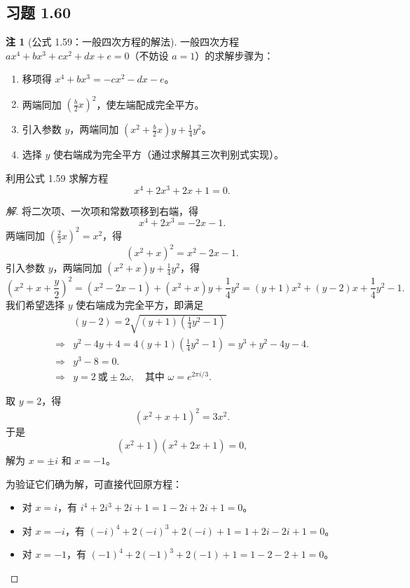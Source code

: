 \documentclass[11pt,a4paper]{article}
\theoremstyle{definition}
\newtheorem{remark}[theorem]{注}
\newenvironment{solution}{\begin{proof}[解]}{\end{proof}}
\begin{document}
\subsection{习题 1.60}

\begin{remark}[公式 1.59：一般四次方程的解法]
  一般四次方程 $ax^4 + bx^3 + cx^2 + dx + e = 0$（不妨设 $a=1$）的求解步骤为：
  \begin{enumerate}
    \item 移项得 $x^4 + bx^3 = -cx^2 - dx - e$。
    \item 两端同加 $(\frac{b}{2}x)^2$，使左端配成完全平方。
    \item 引入参数 $y$，两端同加 $(x^2 + \frac{b}{2}x)y + \frac{1}{4}y^2$。
    \item 选择 $y$ 使右端成为完全平方（通过求解其三次判别式实现）。
  \end{enumerate}
\end{remark}

利用公式 1.59 求解方程
\[
  x^4 + 2x^3 + 2x + 1 = 0.
\]

\begin{solution}
将二次项、一次项和常数项移到右端，得
\[
  x^4 + 2x^3 = -2x - 1.
\]
两端同加 $(\frac{2}{2}x)^2 = x^2$，得
\[
  (x^2 + x)^2 = x^2 - 2x - 1.
\]
引入参数 $y$，两端同加 $(x^2 + x)y + \frac{1}{4}y^2$，得
\[
  (x^2 + x + \frac{y}{2})^2 = (x^2 - 2x - 1) + (x^2 + x)y + \frac{1}{4}y^2
  = (y+1) x^2 + (y - 2)x + \frac{1}{4}y^2 - 1.
\]
我们希望选择 $y$ 使右端成为完全平方，即满足
\[
  \begin{aligned}
    &(y-2) = 2 \sqrt{(y+1)(\frac{1}{4}y^2-1)} \\
    \Rightarrow& y^2 - 4y + 4 = 4(y+1)(\frac{1}{4}y^2-1) = y^3+y^2-4y-4. \\
    \Rightarrow& y^3 - 8 = 0. \\
    \Rightarrow& y = 2 \ \text{或} \pm 2\omega, \quad \text{其中 } \omega = e^{2\pi i/3}.
  \end{aligned}
\]

取 $y = 2$，得
\[
  (x^2 + x + 1)^2 = 3x^2.
\]
于是
\[
  (x^2 + 1)(x^2 + 2x + 1) = 0,
\]
解为 $x = \pm i$ 和 $x = -1$。

为验证它们确为解，可直接代回原方程：
\begin{itemize}
  \item 对 $x = i$，有 $i^4 + 2i^3 + 2i + 1 = 1 - 2i + 2i + 1 = 0$。
  \item 对 $x = -i$，有 $(-i)^4 + 2(-i)^3 + 2(-i) + 1 = 1 + 2i - 2i + 1 = 0$。
  \item 对 $x = -1$，有 $(-1)^4 + 2(-1)^3 + 2(-1) + 1 = 1 - 2 - 2 + 1 = 0$。
\end{itemize}
\end{solution}
\end{document}
